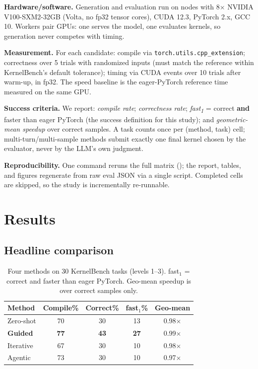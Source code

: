 \documentclass[conference]{IEEEtran}
\begin{document}
\textbf{Hardware/software.} Generation and evaluation run on nodes with 8$\times$
NVIDIA V100-SXM2-32GB (Volta, no fp32 tensor cores), CUDA 12.3, PyTorch 2.x, GCC
10. Workers pair GPUs: one serves the model, one evaluates kernels, so generation
never competes with timing.

\textbf{Measurement.} For each candidate: compile via
\texttt{torch.utils.cpp\_extension}; correctness over 5 trials with randomized
inputs (must match the reference within KernelBench's default tolerance); timing
via CUDA events over 10 trials after warm-up, in fp32. The speed baseline is the
eager-PyTorch reference time measured on the same GPU.

\textbf{Success criteria.} We report: \emph{compile rate}; \emph{correctness rate};
\emph{fast\textsubscript{1}} = correct \textbf{and} faster than eager PyTorch (the
success definition for this study); and \emph{geometric-mean speedup} over correct
samples. A task counts once per (method, task) cell; multi-turn/multi-sample
methods submit exactly one final kernel chosen by the evaluator, never by the LLM's
own judgment.

\textbf{Reproducibility.} One command reruns the full matrix
(); the report, tables, and figures
regenerate from raw eval JSON via a single script. Completed cells are skipped, so
the study is incrementally re-runnable.

\section{Results}

\subsection{Headline comparison}

\begin{table}[t]
\caption{Four methods on 30 KernelBench tasks (levels 1--3). fast$_1$ = correct and
faster than eager PyTorch. Geo-mean speedup is over correct samples only.}
\label{tab:headline}
\centering
\begin{tabular}{lcccc}
\toprule
Method & Compile\% & Correct\% & fast$_1$\% & Geo-mean \\
\midrule
Zero-shot   & 70 & 30 & 13 & 0.98$\times$ \\
\textbf{Guided} & \textbf{77} & \textbf{43} & \textbf{27} & 0.99$\times$ \\
Iterative   & 67 & 30 & 10 & 0.98$\times$ \\
Agentic     & 73 & 30 & 10 & 0.97$\times$ \\
\bottomrule
\end{tabular}
\end{table}
\end{document}
